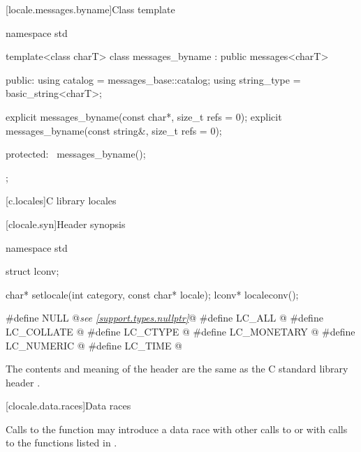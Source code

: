 [locale.messages.byname]{Class template }

%
\begin{codeblock}
namespace std {
  template<class charT>
    class messages_byname : public messages<charT> {
    public:
      using catalog     = messages_base::catalog;
      using string_type = basic_string<charT>;

      explicit messages_byname(const char*, size_t refs = 0);
      explicit messages_byname(const string&, size_t refs = 0);

    protected:
      ~messages_byname();
    };
}
\end{codeblock}

[c.locales]{C library locales}

[clocale.syn]{Header  synopsis}

%
%
%
%
%
%
%
%
%
%
\begin{codeblock}
namespace std {
  struct lconv;

  char* setlocale(int category, const char* locale);
  lconv* localeconv();
}

#define NULL @\textit{see \ref{support.types.nullptr}}@
#define LC_ALL @\seebelow@
#define LC_COLLATE @\seebelow@
#define LC_CTYPE @\seebelow@
#define LC_MONETARY @\seebelow@
#define LC_NUMERIC @\seebelow@
#define LC_TIME @\seebelow@
\end{codeblock}

\pnum
The contents and meaning of the header 
are the same as the C standard library header .

[clocale.data.races]{Data races}

\pnum
Calls to the function 
may introduce a data race
with other calls to  or
with calls to the functions listed in .


